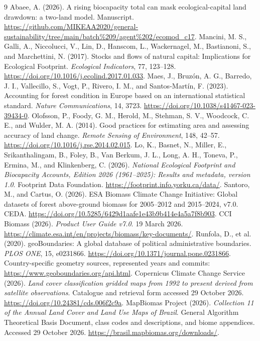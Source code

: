 \documentclass[11pt,a4paper]{article}
\begin{document}
\begin{thebibliography}{9}
 Abaee, A. (2026). A rising biocapacity total can mask ecological-capital land drawdown: a two-land model. Manuscript. \url{https://github.com/MIKEAA2020/general-sustainability/tree/main/batch%209/agent%202/ecomod_c17}.
 Mancini, M. S., Galli, A., Niccolucci, V., Lin, D., Hanscom, L., Wackernagel, M., Bastianoni, S., and Marchettini, N. (2017). Stocks and flows of natural capital: Implications for Ecological Footprint. \emph{Ecological Indicators}, 77, 123--128. \url{https://doi.org/10.1016/j.ecolind.2017.01.033}.
 Maes, J., Bruz\'on, A. G., Barredo, J. I., Vallecillo, S., Vogt, P., Rivero, I. M., and Santos-Mart\'in, F. (2023). Accounting for forest condition in Europe based on an international statistical standard. \emph{Nature Communications}, 14, 3723. \url{https://doi.org/10.1038/s41467-023-39434-0}.
 Olofsson, P., Foody, G. M., Herold, M., Stehman, S. V., Woodcock, C. E., and Wulder, M. A. (2014). Good practices for estimating area and assessing accuracy of land change. \emph{Remote Sensing of Environment}, 148, 42--57. \url{https://doi.org/10.1016/j.rse.2014.02.015}.
 Lo, K., Basnet, N., Miller, E., Srikanthalingam, B., Foley, B., Van Berkum, J. L., Long, A. H., Toneva, P., Ermina, M., and Klinkenberg, C. (2026). \emph{National Ecological Footprint and Biocapacity Accounts, Edition 2026 (1961--2025): Results and metadata, version 1.0}. Footprint Data Foundation. \url{https://footprint.info.yorku.ca/data/}.
 Santoro, M., and Cartus, O. (2026). ESA Biomass Climate Change Initiative: Global datasets of forest above-ground biomass for 2005--2012 and 2015--2024, v7.0. CEDA. \url{https://doi.org/10.5285/6429d1aafe1e43b9b414e4a5a7f8b903}.
 CCI Biomass (2026). \emph{Product User Guide v7.0}. 19 March 2026. \url{https://climate.esa.int/en/projects/biomass/key-documents/}.
 Runfola, D., et al. (2020). geoBoundaries: A global database of political administrative boundaries. \emph{PLOS ONE}, 15, e0231866. \url{https://doi.org/10.1371/journal.pone.0231866}. Country-specific geometry sources, represented years and commits: \url{https://www.geoboundaries.org/api.html}.
 Copernicus Climate Change Service (2026). \emph{Land cover classification gridded maps from 1992 to present derived from satellite observations}. Catalogue and retrieval form accessed 29 October 2026. \url{https://doi.org/10.24381/cds.006f2c9a}.
 MapBiomas Project (2026). \emph{Collection 11 of the Annual Land Cover and Land Use Maps of Brazil}. General Algorithm Theoretical Basis Document, class codes and descriptions, and biome appendices. Accessed 29 October 2026. \url{https://brasil.mapbiomas.org/downloads/}.
\end{thebibliography}
\end{document}
